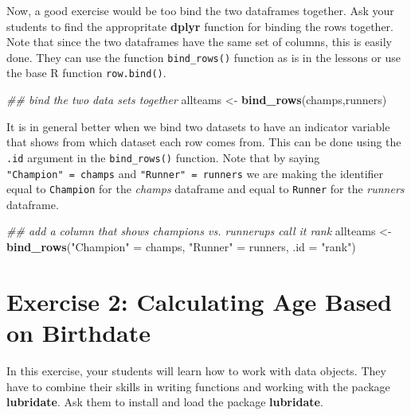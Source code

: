 \documentclass[]{book}
\newenvironment{Shaded}{\begin{snugshade}}{\end{snugshade}}
\newcommand{\CommentTok}[1]{\textcolor[rgb]{0.56,0.35,0.01}{\textit{#1}}}
\newcommand{\DataTypeTok}[1]{\textcolor[rgb]{0.13,0.29,0.53}{#1}}
\newcommand{\KeywordTok}[1]{\textcolor[rgb]{0.13,0.29,0.53}{\textbf{#1}}}
\newcommand{\NormalTok}[1]{#1}
\newcommand{\StringTok}[1]{\textcolor[rgb]{0.31,0.60,0.02}{#1}}
\begin{document}
Now, a good exercise would be too bind the two dataframes together. Ask your students to find the appropritate \textbf{dplyr} function for binding the rows together. Note that since the two dataframes have the same set of columns, this is easily done. They can use the function \texttt{bind\_rows()} function as is in the lessons or use the base R function \texttt{row.bind()}.

\begin{Shaded}
\begin{Highlighting}[]
\CommentTok{## bind the two data sets together}
\NormalTok{allteams <-}\StringTok{ }\KeywordTok{bind_rows}\NormalTok{(champs,runners)}
\end{Highlighting}
\end{Shaded}

It is in general better when we bind two datasets to have an indicator variable that shows from which dataset each row comes from. This can be done using the \texttt{.id} argument in the \texttt{bind\_rows()} function. Note that by saying \texttt{"Champion"\ =\ champs} and \texttt{"Runner"\ =\ runners} we are making the identifier equal to \texttt{Champion} for the \emph{champs} dataframe and equal to \texttt{Runner} for the \emph{runners} dataframe.

\begin{Shaded}
\begin{Highlighting}[]
\CommentTok{## add a column that shows champions vs. runnerups call it rank}
\NormalTok{allteams <-}\StringTok{ }\KeywordTok{bind_rows}\NormalTok{(}\StringTok{"Champion"}\NormalTok{ =}\StringTok{ }\NormalTok{champs, }\StringTok{"Runner"}\NormalTok{ =}\StringTok{ }\NormalTok{runners, }\DataTypeTok{.id =} \StringTok{"rank"}\NormalTok{)}
\end{Highlighting}
\end{Shaded}

\hypertarget{exercise-2-calculating-age-based-on-birthdate}{%
\section*{Exercise 2: Calculating Age Based on Birthdate}\label{exercise-2-calculating-age-based-on-birthdate}}

In this exercise, your students will learn how to work with data objects. They have to combine their skills in writing functions and working with the package \textbf{lubridate}. Ask them to install and load the package \textbf{lubridate}.
\end{document}
